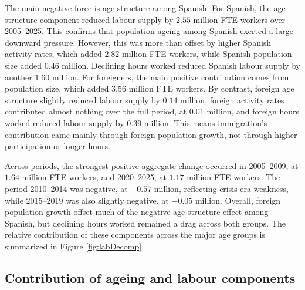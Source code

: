 \vspace{0.7em}\par
The main negative force is age structure among Spanish. For Spanish, the age-structure component reduced labour supply by \(2.55\) million FTE workers over 2005--2025. This confirms that population ageing among Spanish exerted a large downward pressure. However, this was more than offset by higher Spanish activity rates, which added \(2.82\) million FTE workers, while Spanish population size added \(0.46\) million. Declining hours worked reduced Spanish labour supply by another \(1.60\) million. For foreigners, the main positive contribution comes from population size, which added \(3.56\) million FTE workers. By contrast, foreign age structure slightly reduced labour supply by \(0.14\) million, foreign activity rates contributed almost nothing over the full period, at \(0.01\) million, and foreign hours worked reduced labour supply by \(0.39\) million. This means immigration's contribution came mainly through foreign population growth, not through higher participation or longer hours.

\vspace{0.7em}\par
Across periods, the strongest positive aggregate change occurred in 2005--2009, at \(1.64\) million FTE workers, and 2020--2025, at \(1.17\) million FTE workers. The period 2010--2014 was negative, at \(-0.57\) million, reflecting crisis-era weakness, while 2015--2019 was also slightly negative, at \(-0.05\) million. Overall, foreign population growth offset much of the negative age-structure effect among Spanish, but declining hours worked remained a drag across both groups. The relative contribution of these components across the major age groups is summarized in Figure \ref{fig:labDecomp}.


\subsection{Contribution of ageing and labour components}

